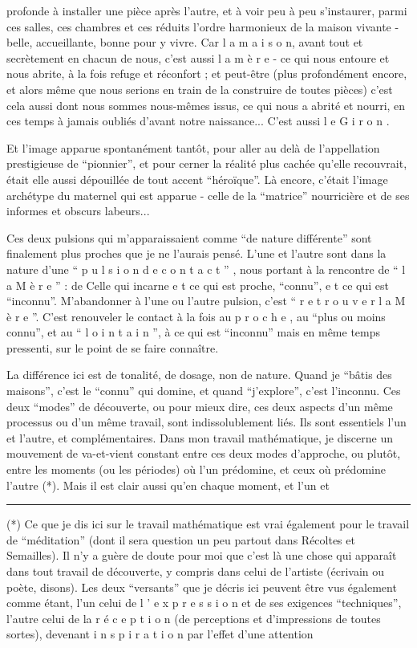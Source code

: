 profonde à installer une pièce après l'autre, et à voir peu à peu s'instaurer, parmi ces salles, ces chambres et ces réduits l'ordre harmonieux de la maison vivante - belle, accueillante, bonne pour y vivre. Car l a \quad m a i s o n, avant tout et secrètement en chacun de nous, c'est aussi l a \quad m è r e - ce qui nous entoure et nous abrite, à la fois refuge et réconfort ; et peut-être (plus profondément encore, et alors même que nous serions en train de la construire de toutes pièces) c'est cela aussi dont nous sommes nous-mêmes issus, ce qui nous a abrité et nourri, en ces temps à jamais oubliés d'avant notre naissance... C'est aussi l e \quad G i r o n .

Et l'image apparue spontanément tantôt, pour aller au delà de l'appellation prestigieuse de ``pionnier'', et pour cerner la réalité plus cachée qu'elle recouvrait, était elle aussi dépouillée de tout accent ``héroïque''. Là encore, c'était l'image archétype du maternel qui est apparue - celle de la ``matrice'' nourricière et de ses informes et obscurs labeurs...

Ces deux pulsions qui m'apparaissaient comme ``de nature différente'' sont finalement plus proches que je ne l'aurais pensé. L'une et l'autre sont dans la nature d'une `` p u l s i o n \quad d e \quad c o n t a c t '' , nous portant à la rencontre de `` l a \quad M è r e '' : de Celle qui incarne e t ce qui est proche, ``connu'', e t ce qui est ``inconnu''. M'abandonner à l'une ou l'autre pulsion, c'est `` r e t r o u v e r \quad l a \quad M è r e ''. C'est renouveler le contact à la fois au p r o c h e , au ``plus ou moins connu'', et au `` l o i n t a i n '', à ce qui est ``inconnu'' mais en même temps pressenti, sur le point de se faire connaître.

La différence ici est de tonalité, de dosage, non de nature. Quand je ``bâtis des maisons'', c'est le ``connu'' qui domine, et quand ``j'explore'', c'est l'inconnu. Ces deux ``modes'' de découverte, ou pour mieux dire, ces deux aspects d'un même processus ou d'un même travail, sont indissolublement liés. Ils sont essentiels l'un et l'autre, et complémentaires. Dans mon travail mathématique, je discerne un mouvement de va-et-vient constant entre ces deux modes d'approche, ou plutôt, entre les moments (ou les périodes) où l'un prédomine, et ceux où prédomine l'autre (*). Mais il est clair aussi qu'en chaque moment, et l'un et

\noindent\rule{2.1cm}{0.4pt}

(*) Ce que je dis ici sur le travail mathématique est vrai également pour le travail de ``méditation'' (dont il sera question un peu partout dans Récoltes et Semailles). Il n'y a guère de doute pour moi que c'est là une chose qui apparaît dans tout travail de découverte, y compris dans celui de l'artiste (écrivain ou poète, disons). Les deux ``versants'' que je décris ici peuvent être vus également comme étant, l'un celui de l ' e x p r e s s i o n et de ses exigences ``techniques'', l'autre celui de la r é c e p t i o n (de perceptions et d'impressions de toutes sortes), devenant i n s p i r a t i o n par l'effet d'une attention

